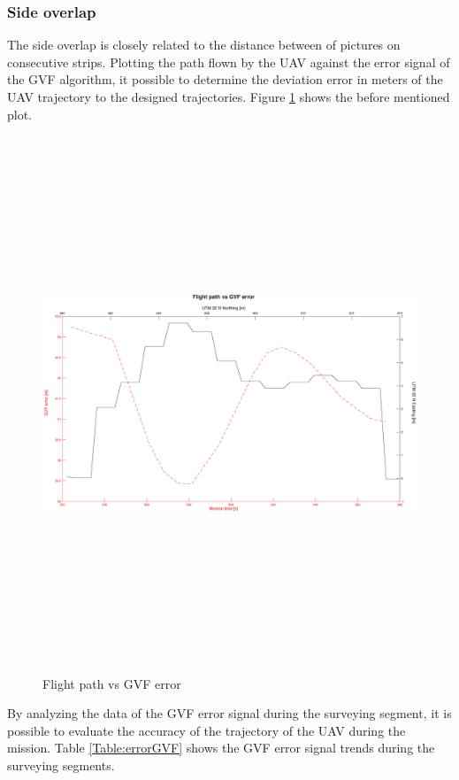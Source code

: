 \subsubsection{Side overlap}
The side overlap is closely related to the distance between of pictures on consecutive strips. Plotting  the path flown by the UAV against the error signal of the GVF algorithm, it possible to determine the deviation error in meters of the UAV trajectory to the designed trajectories. Figure \ref{fig:errorsignalGVF} shows the before mentioned plot.
\begin{figure}[H]
\centering
\includegraphics[width=\textwidth,height=16cm]{imagenes/StripvsGVF.eps}
\caption{Flight path vs GVF error}
\label{fig:errorsignalGVF}
\end{figure}
By analyzing the data of the GVF error signal during the surveying segment, it is possible to evaluate the accuracy of the trajectory of the UAV during the mission. Table \ref{Table:errorGVF} shows the GVF error signal trends during the surveying segments.
